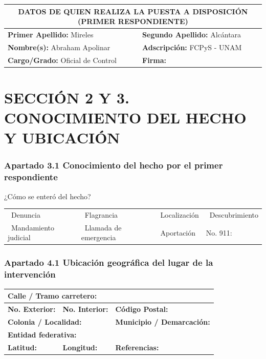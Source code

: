 \documentclass[10pt,letterpaper]{article}
\newcommand{\casilla}{\text{\Large$\square$}}
\newcommand{\ApellPRes}{Mireles}
\newcommand{\ApellSRes}{Alcántara}
\newcommand{\NomRes}{Abraham Apolinar}
\newcommand{\AdscripcionRes}{FCPyS - UNAM}
\newcommand{\CargoRes}{Oficial de Control}
\begin{document}
\begin{tabularx}{\textwidth}{|X|X|}
\hline
\multicolumn{2}{|c|}{\textbf{DATOS DE QUIEN REALIZA LA PUESTA A DISPOSICIÓN (PRIMER RESPONDIENTE)}} \\
\hline
\textbf{Primer Apellido:} \ApellPRes & \textbf{Segundo Apellido:} \ApellSRes \\
\hline
\textbf{Nombre(s):} \NomRes & \textbf{Adscripción:} \AdscripcionRes \\
\hline
\textbf{Cargo/Grado:} \CargoRes & \textbf{Firma:} \\[0.8cm]
\hline
\end{tabularx}

\vspace{0.8cm}
\pagebreak

\section*{SECCIÓN 2 Y 3. CONOCIMIENTO DEL HECHO Y UBICACIÓN}

\subsubsection*{Apartado 3.1 Conocimiento del hecho por el primer respondiente}
¿Cómo se enteró del hecho? \\
\begin{tabularx}{\textwidth}{XXXX}
\casilla~Denuncia & \casilla~Flagrancia & \casilla~Localización & \casilla~Descubrimiento \\
\casilla~Mandamiento judicial & \casilla~Llamada de emergencia & \casilla~Aportación & No. 911: \underline{\hspace{3cm}}
\end{tabularx}

\vspace{0.6cm}

\subsubsection*{Apartado 4.1 Ubicación geográfica del lugar de la intervención}
\begin{tabularx}{\textwidth}{|X|X|X|}
\hline
\multicolumn{3}{|l|}{\textbf{Calle / Tramo carretero:}} \\ \hline
\textbf{No. Exterior:} & \textbf{No. Interior:} & \textbf{Código Postal:} \\ \hline
\multicolumn{2}{|l|}{\textbf{Colonia / Localidad:}} & \textbf{Municipio / Demarcación:} \\ \hline
\multicolumn{3}{|l|}{\textbf{Entidad federativa:}} \\ \hline
\textbf{Latitud:} & \textbf{Longitud:} & \textbf{Referencias:} \\ \hline
\end{tabularx}
\end{document}
